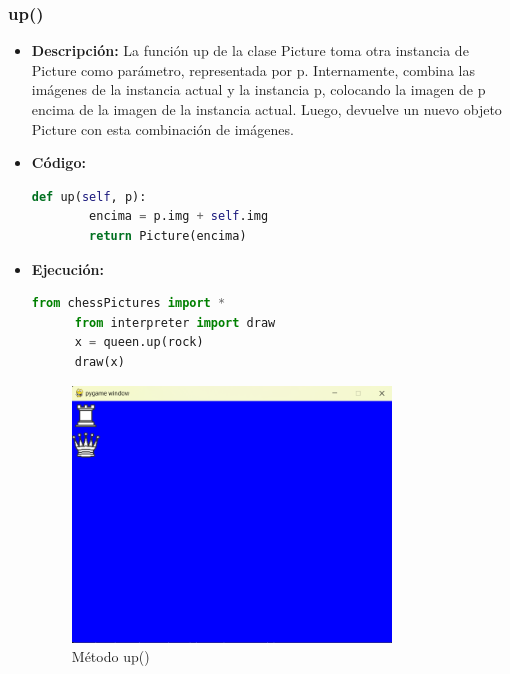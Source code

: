 \documentclass{article}
\begin{document}
  \subsubsection{up()}
  \begin{itemize}
    \item \textbf{Descripción: }La función up de la clase Picture toma otra instancia de Picture 
      como parámetro, representada por p. Internamente, combina las imágenes de la instancia actual y la instancia p, 
      colocando la imagen de p encima de la imagen de la instancia actual. Luego, devuelve un nuevo objeto Picture con 
      esta combinación de imágenes.
    \newpage
    \item \textbf{Código: }
    \begin{lstlisting}[language=Python, caption=Método up()]
      def up(self, p):
        encima = p.img + self.img
        return Picture(encima)
    \end{lstlisting}
    \item \textbf{Ejecución:}
    \begin{lstlisting}[language=Python, caption=Prueba up()]
      from chessPictures import *
      from interpreter import draw
      x = queen.up(rock)
      draw(x)
    \end{lstlisting}
    \begin{figure}[H]
      \centering
      \includegraphics[width=0.8\textwidth, keepaspectratio]{img/up.png}
      \caption{Método up()}
    \end{figure}
  \end{itemize}
  
\end{document}
